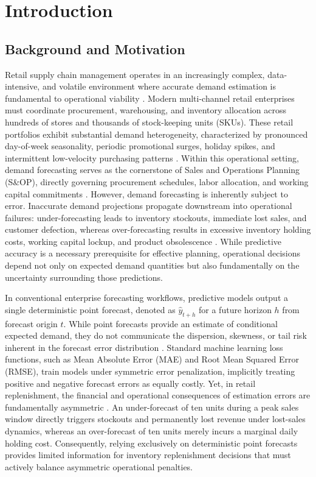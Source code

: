\section{Introduction}

\subsection{Background and Motivation}
Retail supply chain management operates in an increasingly complex, data-intensive, and volatile environment where accurate demand estimation is fundamental to operational viability \cite{tiwari2025agentic}. Modern multi-channel retail enterprises must coordinate procurement, warehousing, and inventory allocation across hundreds of stores and thousands of stock-keeping units (SKUs). These retail portfolios exhibit substantial demand heterogeneity, characterized by pronounced day-of-week seasonality, periodic promotional surges, holiday spikes, and intermittent low-velocity purchasing patterns \cite{mitra2022comparative, venkiteela2025machine}. Within this operational setting, demand forecasting serves as the cornerstone of Sales and Operations Planning (S\&OP), directly governing procurement schedules, labor allocation, and working capital commitments \cite{mustapha2025forecasting}. However, demand forecasting is inherently subject to error. Inaccurate demand projections propagate downstream into operational failures: under-forecasting leads to inventory stockouts, immediate lost sales, and customer defection, whereas over-forecasting results in excessive inventory holding costs, working capital lockup, and product obsolescence \cite{spanos2022application, malik2024sales}. While predictive accuracy is a necessary prerequisite for effective planning, operational decisions depend not only on expected demand quantities but also fundamentally on the uncertainty surrounding those predictions.

In conventional enterprise forecasting workflows, predictive models output a single deterministic point forecast, denoted as $\hat{y}_{t+h}$ for a future horizon $h$ from forecast origin $t$. While point forecasts provide an estimate of conditional expected demand, they do not communicate the dispersion, skewness, or tail risk inherent in the forecast error distribution \cite{gneiting2007strictly}. Standard machine learning loss functions, such as Mean Absolute Error (MAE) and Root Mean Squared Error (RMSE), train models under symmetric error penalization, implicitly treating positive and negative forecast errors as equally costly. Yet, in retail replenishment, the financial and operational consequences of estimation errors are fundamentally asymmetric \cite{ban2019big, bertsimas2020predictive}. An under-forecast of ten units during a peak sales window directly triggers stockouts and permanently lost revenue under lost-sales dynamics, whereas an over-forecast of ten units merely incurs a marginal daily holding cost. Consequently, relying exclusively on deterministic point forecasts provides limited information for inventory replenishment decisions that must actively balance asymmetric operational penalties.

